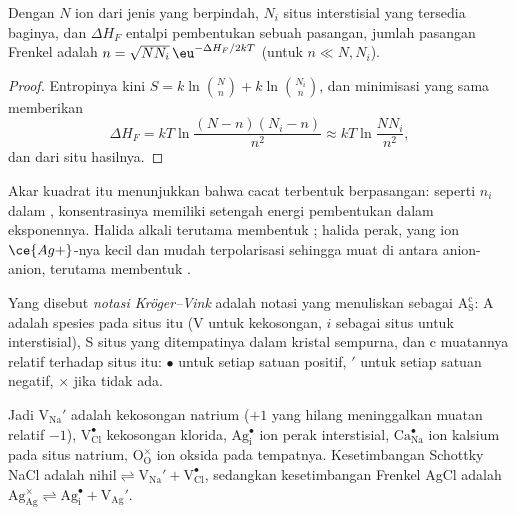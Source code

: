 \begin{proposition}\label{prop:b3:solid-state:frenkel}
Dengan $N$ ion dari jenis yang berpindah, $N_i$ situs interstisial yang tersedia baginya, dan
$\Delta H_F$ entalpi pembentukan sebuah pasangan, jumlah pasangan Frenkel adalah $n =
\sqrt{NN_i}\,\eu^{-\Delta H_F/2kT}$ (untuk $n \ll N, N_i$).
\end{proposition}

\begin{proof}
Entropinya kini $S = k\ln\binom{N}{n} + k\ln\binom{N_i}{n}$, dan minimisasi yang sama memberikan
\[
  \Delta H_F = kT\ln\frac{(N - n)(N_i - n)}{n^2} \approx kT\ln\frac{NN_i}{n^2},
\]
dan dari situ hasilnya.
\end{proof}

Akar kuadrat itu menunjukkan bahwa cacat terbentuk berpasangan: seperti $n_i$ dalam ,
konsentrasinya memiliki setengah energi pembentukan dalam eksponennya. Halida alkali
terutama membentuk ; halida perak, yang ion
$\ce{Ag+}$-nya kecil dan mudah terpolarisasi sehingga muat di antara anion-anion, terutama membentuk .

\begin{definition}\label{def:b3:solid-state:kroger-vink}
Yang disebut \emph{notasi Kröger--Vink} adalah notasi yang menuliskan 
sebagai $\mathrm{A_S^c}$: A adalah spesies pada situs itu (V untuk kekosongan, $i$ sebagai situs
untuk interstisial), S situs yang ditempatinya dalam kristal sempurna, dan c muatannya
relatif terhadap situs itu: $\bullet$ untuk setiap satuan positif, $'$ untuk setiap satuan
negatif, $\times$ jika tidak ada.
\end{definition}

Jadi $\mathrm{V_{Na}'}$ adalah kekosongan natrium ($+1$ yang hilang meninggalkan muatan relatif $-1$),
$\mathrm{V_{Cl}^{\bullet}}$ kekosongan klorida, $\mathrm{Ag_i^{\bullet}}$ ion perak interstisial, $\mathrm{Ca_{Na}^{\bullet}}$ ion kalsium pada
situs natrium, $\mathrm{O_O^{\times}}$ ion oksida pada tempatnya. Kesetimbangan Schottky NaCl adalah
$\text{nihil} \rightleftharpoons \mathrm{V_{Na}' + V_{Cl}^{\bullet}}$, sedangkan kesetimbangan Frenkel AgCl adalah
$\mathrm{Ag_{Ag}^{\times}} \rightleftharpoons \mathrm{Ag_i^{\bullet} + V_{Ag}'}$.

